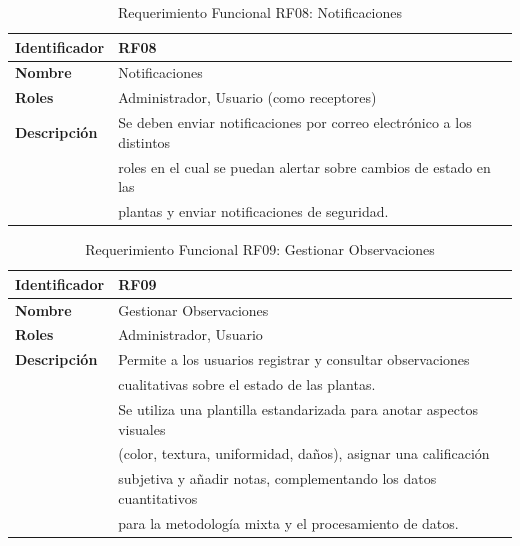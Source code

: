   \begin{table}[H]
	\centering
	\caption{Requerimiento Funcional RF08: Notificaciones}
	\label{tab:rf08}
	\begin{tabular}{@{}ll@{}} 
	  \toprule
	  \textbf{Identificador} & RF08 \\
	  \midrule
	  \textbf{Nombre} & Notificaciones \\
	  \textbf{Roles} & Administrador, Usuario (como receptores) \\
	  \textbf{Descripción} & Se deben enviar notificaciones por correo electrónico a los distintos \\
						   & roles en el cual se puedan alertar sobre cambios de estado en las \\
						   & plantas y enviar notificaciones de seguridad. \\
	  \bottomrule
	\end{tabular}
  \end{table}
  
  \begin{table}[H]
	\centering
	\caption{Requerimiento Funcional RF09: Gestionar Observaciones}
	\label{tab:rf09}
	\begin{tabular}{@{}ll@{}} 
	  \toprule
	  \textbf{Identificador} & RF09 \\ 
	  \midrule
	  \textbf{Nombre} & Gestionar Observaciones \\ 
	  \textbf{Roles} & Administrador, Usuario\\ 
	  \textbf{Descripción} & Permite a los usuarios registrar y consultar observaciones \\
						   & cualitativas sobre el estado de las plantas.\\
						   & Se utiliza una plantilla estandarizada para anotar aspectos visuales \\
						   & (color, textura, uniformidad, daños), asignar una calificación \\
						   & subjetiva y añadir notas, complementando los datos cuantitativos \\
						   & para la metodología mixta y el procesamiento de datos. \\
	  \bottomrule
	\end{tabular}
  \end{table}
  
